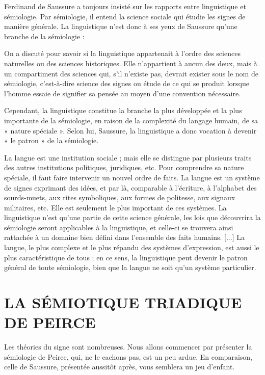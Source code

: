 Ferdinand de Saussure a toujours insisté sur les rapports entre linguistique et sémiologie. Par sémiologie, il entend la science sociale qui étudie les signes de manière générale. La linguistique n’est donc à ses yeux de Saussure qu’une branche de la sémiologie :
\begin{lecture}{}
On a discuté pour savoir si la linguistique appartenait à l’ordre des sciences naturelles ou des sciences historiques. Elle n’appartient à aucun des deux, mais à un compartiment des sciences qui, s’il n’existe pas, devrait exister sous le nom de sémiologie, c’est-à-dire science des signes ou étude de ce qui se produit lorsque l’homme essaie de signifier sa pensée au moyen d’une convention nécessaire.
\end{lecture}
Cependant, la linguistique constitue la branche la plus développée et la plus importante de la sémiologie, en raison de la complexité du langage humain, de sa « nature spéciale ». Selon lui, Saussure, la linguistique a donc vocation à devenir « le patron » de la sémiologie.
\begin{lecture}{}
La langue est une institution sociale ; mais elle se distingue par plusieurs traits des autres institutions politiques, juridiques, etc. Pour comprendre sa nature spéciale, il faut faire intervenir un nouvel ordre de faits. La langue est un système de signes exprimant des idées, et par là, comparable à l’écriture, à l’alphabet des sourds-muets, aux rites symboliques, aux formes de politesse, aux signaux militaires, etc. Elle est seulement le plus important de ces systèmes. La linguistique n’est qu’une partie de cette science générale, les lois que découvrira la sémiologie seront applicables à la linguistique, et celle-ci se trouvera ainsi rattachée à un domaine bien défini dans l’ensemble des faits humains. [...] La langue, le plus complexe et le plus répandu des systèmes d’expression, est aussi le plus caractéristique de tous ; en ce sens, la linguistique peut devenir le patron général de toute sémiologie, bien que la langue ne soit qu’un système particulier.
\end{lecture}

\section{LA SÉMIOTIQUE TRIADIQUE DE PEIRCE}
Les théories du signe sont nombreuses. Nous allons commencer par présenter la sémiologie de Peirce, qui, ne le cachons pas, est un peu ardue. En comparaison, celle de Saussure, présentée aussitôt après, vous semblera un jeu d’enfant.


